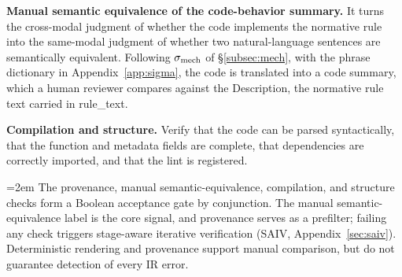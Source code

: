 \textbf{Manual semantic equivalence of the code-behavior summary.} It turns
the cross-modal judgment of whether the code implements the
normative rule into the same-modal judgment of whether two natural-language
sentences are semantically equivalent. Following $\sigma_{\mathrm{mech}}$ of \S\ref{subsec:mech}, with the
phrase dictionary in Appendix~\ref{app:sigma}, the code is translated into a
code summary, which a human reviewer compares against the Description, the
normative rule text carried in rule\_text. 

\textbf{Compilation and structure.} Verify that the code can be parsed
syntactically, that the function and metadata fields are complete, that
dependencies are correctly imported, and that the lint is registered.

\begingroup\emergencystretch=2em\relax
The provenance, manual semantic-equivalence, compilation, and structure checks
form a Boolean acceptance gate by conjunction. The manual semantic-equivalence
label is the core signal, and provenance serves as a prefilter; failing any
check triggers stage-aware iterative verification
(SAIV, Appendix~\ref{sec:saiv}).
Deterministic rendering and provenance support manual comparison, but do not
guarantee detection of every IR error.
\par\endgroup


